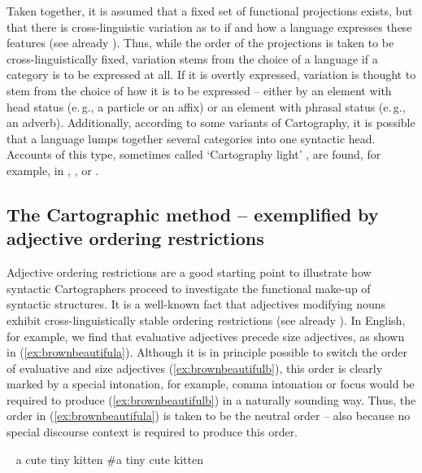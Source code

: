Taken together, it is assumed that a fixed set of functional projections exists, but that there is cross-linguistic variation as to if and how a language expresses these features (see already \citealt{vergnaud1985dependances}). Thus, while the order of the projections is taken to be cross-linguistically fixed, variation stems from the choice of a language if a category is to be expressed at all. If it is overtly expressed, variation is thought to stem from the choice of how it is to be expressed -- either by an element with head status (e.\,g., a particle or an affix) or an element with phrasal status (e.\,g., an adverb). Additionally, according to some variants of Cartography, it is possible that a language lumps together several categories into one syntactic head. Accounts of this type, sometimes called `Cartography light' \citep{van2009alternatives}, are found, for example, in \citet{rizzi1996residual}, \citet{thrainsson1996non}, or \citet{bobaljik1998two}.

\subsection{The Cartographic method -- exemplified by adjective ordering restrictions}

Adjective ordering restrictions are a good starting point to illustrate how syntactic Cartographers proceed to investigate the functional make-up of syntactic structures. It is a well-known fact that adjectives modifying nouns exhibit cross-linguistically stable ordering restrictions (see already \citealt{whorf1945grammatical}). In English, for example, we find that evaluative adjectives precede size adjectives, as shown in (\ref{ex:brownbeautifula}). Although it is in principle possible to switch the order of evaluative and size adjectives (\ref{ex:brownbeautifulb}), this order is clearly marked by a special intonation, for example, comma intonation or focus would be required \citep{sproat1991cross} to produce (\ref{ex:brownbeautifulb}) in a naturally sounding way. Thus, the order in (\ref{ex:brownbeautifula}) is taken to be the neutral order -- also because no special discourse context is required to produce this order.

\begin{exe}
\ex\label{brownbeautiful}\begin{xlist} 
\ex \textcolor{white}{\#}{a cute tiny kitten\label{ex:brownbeautifula} }
\ex \#{a tiny cute kitten \label{ex:brownbeautifulb}}
\end{xlist}
\end{exe}

